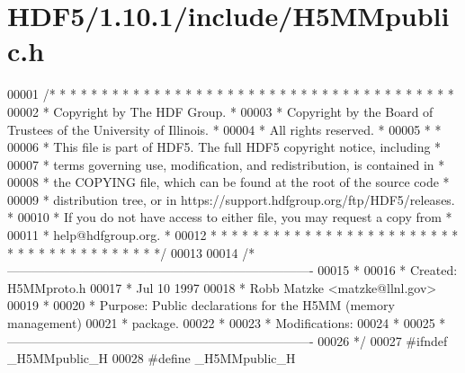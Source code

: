 \hypertarget{_h_d_f5_21_810_81_2include_2_h5_m_mpublic_8h_source}{}\section{H\+D\+F5/1.10.1/include/\+H5\+M\+Mpublic.h}
\label{_h_d_f5_21_810_81_2include_2_h5_m_mpublic_8h_source}

\begin{DoxyCode}
00001 \textcolor{comment}{/* * * * * * * * * * * * * * * * * * * * * * * * * * * * * * * * * * * * * * *}
00002 \textcolor{comment}{ * Copyright by The HDF Group.                                               *}
00003 \textcolor{comment}{ * Copyright by the Board of Trustees of the University of Illinois.         *}
00004 \textcolor{comment}{ * All rights reserved.                                                      *}
00005 \textcolor{comment}{ *                                                                           *}
00006 \textcolor{comment}{ * This file is part of HDF5.  The full HDF5 copyright notice, including     *}
00007 \textcolor{comment}{ * terms governing use, modification, and redistribution, is contained in    *}
00008 \textcolor{comment}{ * the COPYING file, which can be found at the root of the source code       *}
00009 \textcolor{comment}{ * distribution tree, or in https://support.hdfgroup.org/ftp/HDF5/releases.  *}
00010 \textcolor{comment}{ * If you do not have access to either file, you may request a copy from     *}
00011 \textcolor{comment}{ * help@hdfgroup.org.                                                        *}
00012 \textcolor{comment}{ * * * * * * * * * * * * * * * * * * * * * * * * * * * * * * * * * * * * * * */}
00013 
00014 \textcolor{comment}{/*-------------------------------------------------------------------------}
00015 \textcolor{comment}{ *}
00016 \textcolor{comment}{ * Created:             H5MMproto.h}
00017 \textcolor{comment}{ *                      Jul 10 1997}
00018 \textcolor{comment}{ *                      Robb Matzke <matzke@llnl.gov>}
00019 \textcolor{comment}{ *}
00020 \textcolor{comment}{ * Purpose:             Public declarations for the H5MM (memory management)}
00021 \textcolor{comment}{ *                      package.}
00022 \textcolor{comment}{ *}
00023 \textcolor{comment}{ * Modifications:}
00024 \textcolor{comment}{ *}
00025 \textcolor{comment}{ *-------------------------------------------------------------------------}
00026 \textcolor{comment}{ */}
00027 \textcolor{preprocessor}{#ifndef \_H5MMpublic\_H}
00028 \textcolor{preprocessor}{#define \_H5MMpublic\_H}

\end{DoxyCode}
